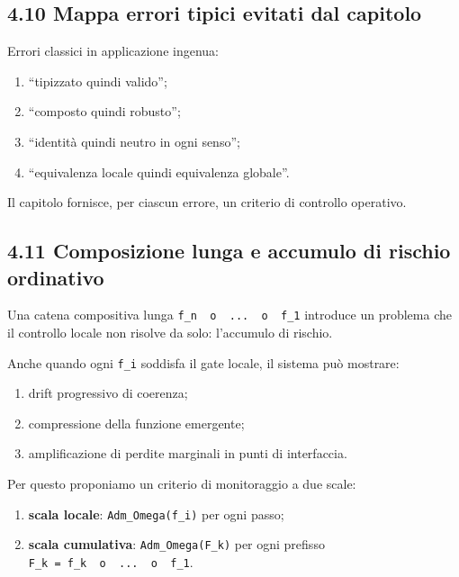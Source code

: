 \subsection{4.10 Mappa errori tipici evitati dal capitolo}

Errori classici in applicazione ingenua:

\begin{enumerate}
\def\labelenumi{\arabic{enumi}.}
\tightlist
\item
  ``tipizzato quindi valido'';
\item
  ``composto quindi robusto'';
\item
  ``identità quindi neutro in ogni senso'';
\item
  ``equivalenza locale quindi equivalenza globale''.
\end{enumerate}

Il capitolo fornisce, per ciascun errore, un criterio di controllo operativo.

\subsection{4.11 Composizione lunga e accumulo di rischio ordinativo}

Una catena compositiva lunga \texttt{f\_n\ \ o\ \ ...\ \ o\ \ f\_1} introduce un problema che il controllo locale non risolve da solo: l'accumulo di rischio.

Anche quando ogni \texttt{f\_i} soddisfa il gate locale, il sistema può mostrare:

\begin{enumerate}
\def\labelenumi{\arabic{enumi}.}
\tightlist
\item
  drift progressivo di coerenza;
\item
  compressione della funzione emergente;
\item
  amplificazione di perdite marginali in punti di interfaccia.
\end{enumerate}

Per questo proponiamo un criterio di monitoraggio a due scale:

\begin{enumerate}
\def\labelenumi{\arabic{enumi}.}
\tightlist
\item
  \textbf{scala locale}: \texttt{Adm\_Omega(f\_i)} per ogni passo;
\item
  \textbf{scala cumulativa}: \texttt{Adm\_Omega(F\_k)} per ogni prefisso \texttt{F\_k\ =\ f\_k\ \ o\ \ ...\ \ o\ \ f\_1}.
\end{enumerate}

